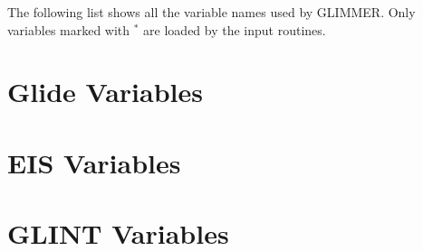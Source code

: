 \label{ug.sec.varlist}
The following list shows all the variable names used by GLIMMER. Only variables marked with $^\ast$ are loaded by the input routines.
\section{Glide Variables}

\section{EIS Variables}

\section{GLINT Variables}

